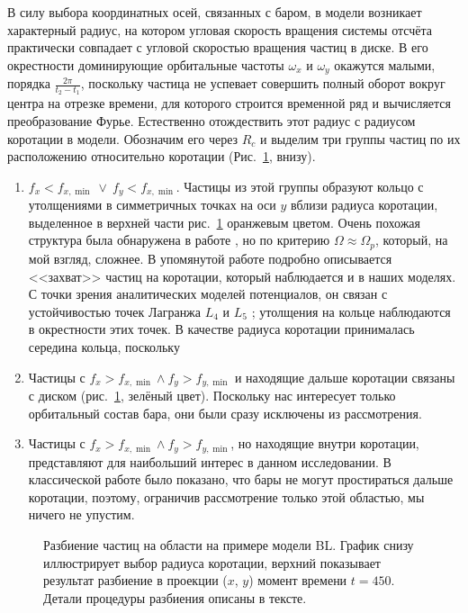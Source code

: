 \documentclass[tikz]{trlnotes}
\begin{document}
В силу выбора координатных осей, связанных с баром, в модели возникает характерный радиус, на котором
угловая скорость вращения системы отсчёта практически совпадает с угловой скоростью вращения частиц в диске.
В его окрестности доминирующие орбитальные частоты $\omega_x$ и $\omega_y$ окажутся малыми, порядка $\frac{2\pi}{t_2
- t_1}$, поскольку частица не успевает совершить полный оборот вокруг центра на отрезке времени, для которого
строится временной ряд и вычисляется преобразование Фурье. Естественно отождествить этот  радиус с радиусом
коротации в модели. Обозначим его через $R_c$ и выделим три группы частиц по их расположению относительно коротации
(Рис.~\ref{fig:disksplit}, внизу).
\begin{enumerate}
  \item $f_x < f_{x, \min} \:\lor\: f_y < f_{x, \min}$.
Частицы из этой группы образуют кольцо с утолщениями в
симметричных точках на оси $y$ вблизи радиуса коротации, выделенное в верхней части рис.~\ref{fig:disksplit}
оранжевым цветом.
Очень похожая структура была обнаружена в работе \citet{ceverino2007}, но по критерию $Ω \approx Ω_p$, который, на мой взгляд, сложнее. В упомянутой работе подробно описывается <<захват>> частиц на коротации, который
наблюдается и в наших моделях. С точки зрения аналитических моделей потенциалов, он связан с устойчивостью
точек Лагранжа $L_4$ и
$L_5$ \citep[Fig.~3.14]{2008gady.book.....B}; утолщения на кольце наблюдаются в окрестности этих точек.
В качестве радиуса коротации принималась середина кольца, поскольку 
\item Частицы с $f_x > f_{x, \min} \land f_y > f_{y, \min}$ и находящие дальше коротации связаны с диском
(рис.~\ref{fig:disksplit}, зелёный цвет). Поскольку нас интересует только орбитальный состав бара, они были сразу исключены из
рассмотрения. 
\item Частицы с $f_x > f_{x, \min} \land f_y > f_{y, \min}$, но находящие внутри коротации,  представляют для
наибольший интерес в данном исследовании. В классической работе \citet{contopoulos1980} было показано, что
бары не могут простираться дальше коротации, поэтому, ограничив рассмотрение только этой областью, мы ничего не
упустим.
\end{enumerate}

\begin{figure}[htpb]
  \centering
  \par
  \caption{Разбиение частиц на области на примере модели BL. График снизу иллюстрирует выбор радиуса коротации,
  верхний показывает результат разбиение в проекции ($x$, $y$) момент времени $t=450$.
Детали процедуры разбиения описаны в тексте.}%
  \label{fig:disksplit}
\end{figure}
\end{document}
